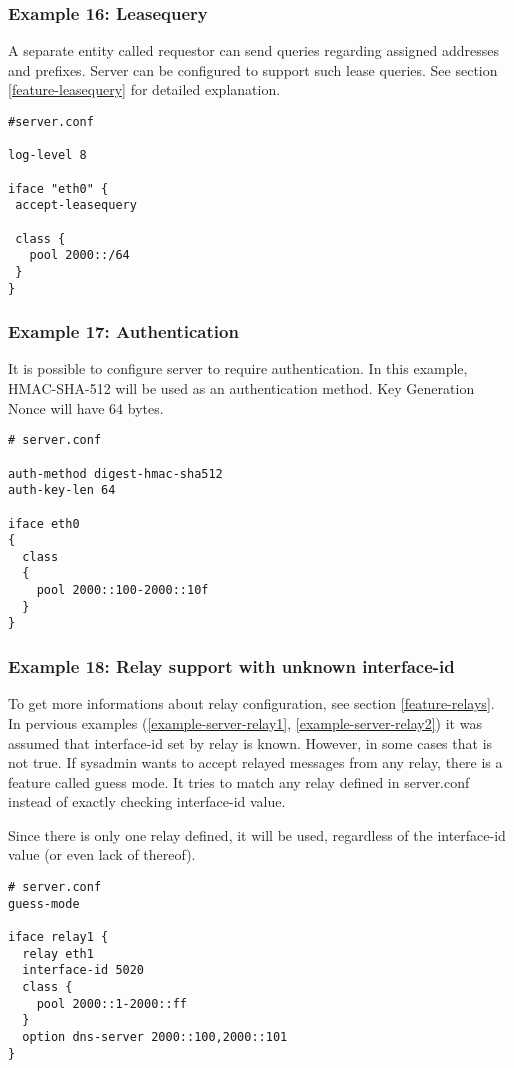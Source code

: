 \subsubsection{Example 16: Leasequery}
A separate entity
called requestor can send queries regarding assigned addresses and
prefixes. Server can be configured to support such lease queries.
See section \ref{feature-leasequery} for detailed explanation.

\begin{lstlisting}
#server.conf

log-level 8

iface "eth0" {
 accept-leasequery

 class {
   pool 2000::/64
 }
}
\end{lstlisting}


\subsubsection{Example 17: Authentication}
\label{example-server-auth}
It is possible to configure server to require authentication. In this
example, HMAC-SHA-512 will be used as an authentication method.
Key Generation Nonce will have 64 bytes.

\begin{lstlisting}
# server.conf

auth-method digest-hmac-sha512
auth-key-len 64

iface eth0
{
  class
  {
    pool 2000::100-2000::10f
  }
}
\end{lstlisting}

\subsubsection{Example 18: Relay support with unknown interface-id}
\label{example-server-relay3}
To get more informations about relay configuration, see section \ref{feature-relays}.
In pervious examples (\ref{example-server-relay1},
\ref{example-server-relay2}) it was assumed that interface-id set by
relay is known. However, in some cases that is not true. If sysadmin
wants to accept relayed messages from any relay, there is a feature
called guess mode. It tries to match any relay defined in server.conf
instead of exactly checking interface-id value.

Since there is only one relay defined, it will be used, regardless of
the interface-id value (or even lack of thereof).

\begin{lstlisting}
# server.conf
guess-mode

iface relay1 {
  relay eth1
  interface-id 5020
  class {
    pool 2000::1-2000::ff
  }
  option dns-server 2000::100,2000::101
}
\end{lstlisting}


